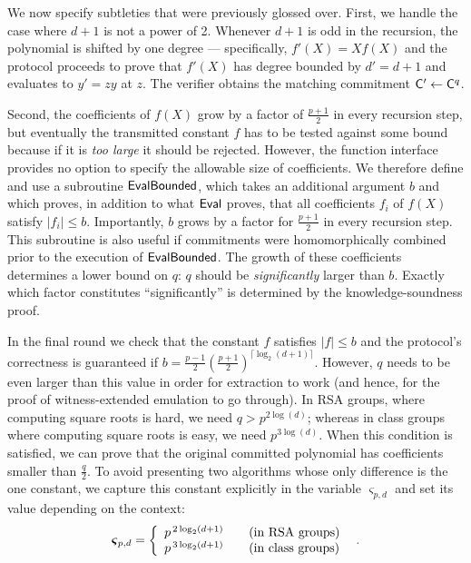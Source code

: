 We now specify subtleties that were previously glossed over. 
First, we handle the case where $d+1$ is not a power of 2.  Whenever $d+1$ is odd in the recursion, the polynomial is shifted by one degree --- specifically, $f'(X) = X f(X)$ and the protocol proceeds to prove that $f'(X)$ has degree bounded by $d' = d+1$ and evaluates to $y' = zy$ at $z$. The verifier obtains the matching commitment $\mathsf{C}'\gets\mathsf{C}^q$.

Second, the coefficients of $f(X)$ grow by a factor of $\frac{p+1}{2}$ in every recursion step, but eventually the transmitted constant $f$ has to be tested against some bound because if it is \emph{too large} it should be rejected. However, the function interface provides no option to specify the allowable size of coefficients. We therefore define and use a subroutine $\textsf{{EvalBounded}}$, which takes an additional argument $b$ and which proves, in addition to what $\textsf{{Eval}}$ proves, that all coefficients $f_i$ of $f(X)$ satisfy $|f_i| \leq b$. Importantly, $b$ grows by a factor for $\frac{p+1}{2}$ in every recursion step. This subroutine is also useful if commitments were homomorphically combined prior to the execution of $\textsf{{EvalBounded}}$. The growth of these coefficients determines a lower bound on $q$: $q$ should be \emph{significantly} larger than $b$. Exactly which factor constitutes ``significantly'' is determined by the knowledge-soundness proof.

In the final round we check that the constant $f$ satisfies $|f|\leq b$ and the protocol's correctness is guaranteed if $b = \frac{p-1}{2}(\frac{p+1}{2})^{\lceil\log_2(d+1)\rceil}$. However, $q$ needs to be even larger than this value in order for extraction to work (and hence, for the proof of witness-extended emulation to go through). In RSA groups, where computing square roots is hard, we need $q>p^{2\log(d)}$; whereas in class groups where computing square roots is easy, we need $p^{3\log(d)}$. When this condition is satisfied, we can prove that the original committed polynomial has coefficients smaller than $\frac{q}{2}$. To avoid presenting two algorithms whose only difference is the one constant, we capture this constant explicitly in the variable $\boldsymbol{\varsigma}_{p,d}$ and set its value depending on the context:
\[
    \boldsymbol{\varsigma}_{p, d} = \left\{
        \begin{array}{ll}
            p^{\,2\log_2(d+1)} & \quad \textnormal{(in RSA groups)} \\
            p^{\,3\log_2(d+1)} & \quad \textnormal{(in class groups)}
        \end{array}
    \right. \enspace .
\]

